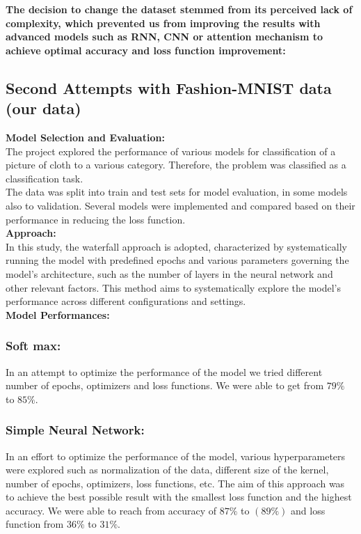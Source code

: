 \documentclass{article}
\begin{document}
\textbf{The decision to change the dataset stemmed from its perceived lack of complexity, which prevented us from improving the results with advanced models such as RNN, CNN or attention mechanism to achieve optimal accuracy and loss function improvement:}
\newpage
\subsection{Second Attempts with Fashion-MNIST data (our data)}
\textbf{Model Selection and Evaluation:}\\
The project explored the performance of various models for classification of a picture of cloth to a various category. Therefore, the problem was classified as a classification task.\\
The data was split into train and test sets for model evaluation, in some models also to validation. Several models were implemented and compared based on their performance in reducing the loss function.\\\newline
\textbf{Approach:}\\
In this study, the waterfall approach is adopted, characterized by systematically running the model with predefined epochs and various parameters governing the model's architecture, such as the number of layers in the neural network and other relevant factors. This method aims to systematically explore the model's performance across different configurations and settings.\\

\textbf{Model Performances:}
\subsubsection{Soft max:}
In an attempt to optimize the performance of the model we tried different number of epochs, optimizers and loss functions. We were able to get from ${79\%}$ to ${85\%}$.\\

\subsubsection{Simple Neural Network:}
In an effort to optimize the performance of the model, various hyperparameters were explored such as normalization of the data, different size of the kernel, number of epochs, optimizers, loss functions, etc.
The aim of this approach was to achieve the best possible result with the smallest loss function and the highest accuracy. We were able to reach from accuracy of ${87\%}$ to $(89\%)$ and loss function from ${36\%}$ to ${31\%}$.\\
\end{document}
